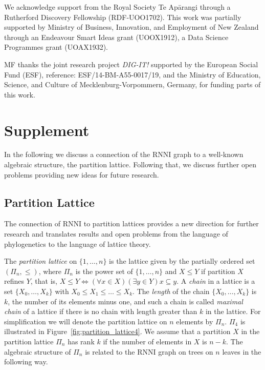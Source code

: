 \documentclass[11pt]{amsart}
\newcommand{\rnni}{\mathrm{RNNI}}
\begin{document}
We acknowledge support from the Royal Society Te Ap\=arangi through a Rutherford Discovery Fellowship (RDF-UOO1702).
This work was partially supported by Ministry of Business, Innovation, and Employment of New Zealand through an Endeavour Smart Ideas grant (UOOX1912), a Data Science Programmes grant (UOAX1932).

MF thanks the joint research project \textit{DIG-IT!} supported by the European Social Fund (ESF), reference: ESF/14-BM-A55-0017/19, and the Ministry of Education, Science, and Culture of Mecklenburg-Vorpommern, Germany, for funding parts of this work.


\printbibliography


\section{Supplement}

In the following we discuss a connection of the $\rnni$ graph to a well-known algebraic structure, the partition lattice.
Following that, we discuss further open problems providing new ideas for future research.

\subsection{Partition Lattice}
The connection of $\rnni$ to partition lattices provides a new direction for further research and translates results and open problems from the language of phylogenetics to the language of lattice theory.

The \emph{partition lattice} on $\{1, \ldots, n\}$ is the lattice given by the partially ordered set $(\Pi_n, \leq)$, where $\Pi_n$ is the power set of $\{1, \ldots, n\}$ and $X \leq Y$ if partition $X$ refines $Y$, that is, $X \leq Y \Leftrightarrow (\forall x \in X)(\exists y \in Y) x \subseteq y$.
A \emph{chain} in a lattice is a set $\{X_0, \ldots, X_k\}$ with $X_0 \leq X_1 \leq \ldots \leq X_k$.
The \emph{length} of the chain $\{X_0, \ldots, X_k\}$ is $k$, the number of its elements minus one, and such a chain is called \emph{maximal chain} of a lattice if there is no chain with length greater than $k$ in the lattice.
For simplification we will denote the partition lattice on $n$ elements by $\Pi_n$.
$\Pi_4$ is illustrated in Figure~\ref{fig:partition_lattice4}.
We assume that a partition $X$ in the partition lattice $\Pi_n$ has rank $k$ if the number of elements in $X$ is $n-k$.
The algebraic structure of $\Pi_n$ is related to the $\rnni$ graph on trees on $n$ leaves in the following way.
\end{document}
